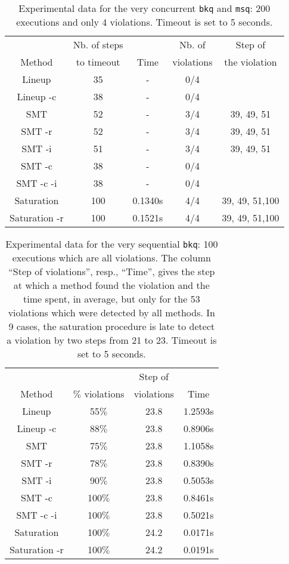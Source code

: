 \begin{table}[t]
  \footnotesize
  \centering
  \setlength{\tabcolsep}{1.8mm}
  \begin{tabular}{ccccc}
   & Nb. of steps  & & Nb. of & Step of  \\
   Method & to timeout & Time & violations & the violation \\
  \hline
  Lineup & 35 & - & 0/4 \\
  Lineup -c & 38 & - & 0/4 \\
  SMT & 52 & - & 3/4 & 39, 49, 51\\
  SMT -r & 52 & - & 3/4 & 39, 49, 51\\
  SMT -i & 51 & - & 3/4 & 39, 49, 51\\
  SMT -c & 38 & - & 0/4 \\
  SMT -c -i & 38 & - & 0/4 \\
  Saturation & 100 & 0.1340s & 4/4 & 39, 49, 51,100\\
  Saturation -r  & 100 & 0.1521s & 4/4 &39, 49, 51,100 
  \end{tabular} 
  \caption{Experimental data for the very concurrent {\tt bkq} and {\tt msq}: 200 executions and only 4 violations.
  Timeout is set to 5 seconds.
    }
  \label{tab:exp:static}
\end{table}


\begin{table}[t]
  \footnotesize
  \centering
  \setlength{\tabcolsep}{1.8mm}
  \begin{tabular}{cccc}
   	        & 	                     & Step of     \\
   Method & $\%$ violations  & violations & Time \\
  \hline
  Lineup & 55$\%$ & 23.8 & 1.2593s \\
  Lineup -c & 88$\%$ & 23.8 & 0.8906s \\
  SMT & 75$\%$ & 23.8 & 1.1058s \\
  SMT -r & 78$\%$ & 23.8 & 0.8390s\\
  SMT -i & 90$\%$ & 23.8 & 0.5053s\\
  SMT -c & 100$\%$ & 23.8 & 0.8461s \\
  SMT -c -i & 100$\%$ & 23.8 & 0.5021s \\
  Saturation & 100$\%$ & 24.2 & 0.0171s\\
  Saturation -r  & 100$\%$ & 24.2 & 0.0191s
  \end{tabular} 
  \caption{Experimental data for the very sequential {\tt bkq}: 100 executions which are all violations. The column ``Step of violations'', resp., ``Time'',
  gives the step at which a method found the violation and the time spent, in average, but only for the 53 violations
  which were detected by all methods. In 9 cases, the saturation procedure is late to detect a violation by two steps
  from 21 to 23. Timeout is set to 5 seconds.
    }
  \label{tab:exp:static}
\end{table}
